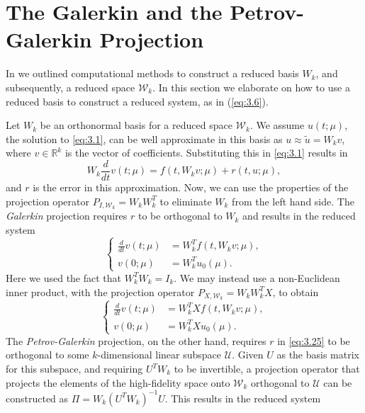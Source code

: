 \section{The Galerkin and the Petrov-Galerkin Projection} \label{sec:3.4}
In  we outlined computational methods to construct a reduced basis $W_k$, and subsequently, a reduced space $\mathcal W_k$. In this section we elaborate on how to use a reduced basis to construct a reduced system, as in (\ref{eq:3.6}).

Let $W_k$ be an orthonormal basis for a reduced space $\mathcal W_k$. We assume $u(t;\mu)$, the solution to \eqref{eq:3.1}, can be well approximate in this basis as $u \approx \tilde u = W_k v$, where $v\in \mathbb R^{k}$ is the vector of coefficients. Substituting this in 
\eqref{eq:3.1} results in
\begin{equation} \label{eq:3.25}
	W_k \frac{d}{dt} v(t;\mu) = f(t,W_kv;\mu) + r(t,u;\mu),
\end{equation}
and $r$ is the error in this approximation. Now, we can use the properties of the projection operator $P_{I,\mathcal W_k} = W_kW_k^T$ to eliminate $W_k$ from the left hand side. The \emph{Galerkin} projection requires $r$ to be orthogonal to $W_k$ and results in the reduced system
\begin{equation} \label{eq:3.26}
	\left\{
	\begin{aligned}
	\frac{d}{dt} v(t;\mu) &= W_k^T f(t,W_kv;\mu), \\
	v(0;\mu) &= W_k^T u_0(\mu).
	\end{aligned}
	\right.
\end{equation}
Here we used the fact that $W_k^TW_k = I_k$. We may instead use a non-Euclidean inner product, with the projection operator $P_{X,\mathcal W_k} = W_kW_k^TX$, to obtain
\begin{equation} \label{eq:3.27}
	\left\{
	\begin{aligned}
	\frac{d}{dt} v(t;\mu) &= W_k^T X f(t,W_kv;\mu), \\
	v(0;\mu) &= W_k^T X u_0(\mu).
	\end{aligned}
	\right.
\end{equation}
The \emph{Petrov-Galerkin} projection, on the other hand, requires $r$ in \eqref{eq:3.25} to be orthogonal to some $k$-dimensional linear subspace $\mathcal U$. Given $U$ as the basis matrix for this subspace, and requiring $U^TW_k$ to be invertible, a projection operator that projects the elements of the high-fidelity space onto $\mathcal W_k$ orthogonal to $\mathcal U$ can be constructed as $\Pi = W_k(U^T W_k)^{-1} U$. This results in the reduced system
